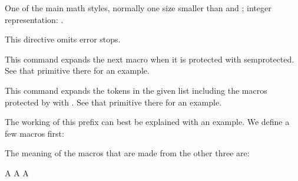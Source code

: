 \stopnewprimitive

\startoldprimitive[title={\prm {scriptstyle}}]

One of the main math styles, normally one size smaller than 
and ; integer representation: \the\scriptstyle.

\stopoldprimitive

\startoldprimitive[title={\prm {scrollmode}}]

    This directive omits error stops.

\stopoldprimitive

\startnewprimitive[title={\prm {semiexpand}}]

This command expands the next macro when it is protected with \prm
{semprotected}. See that primitive there for an example.

\stopnewprimitive

\startnewprimitive[title={\prm {semiexpanded}}]

This command expands the tokens in the given list including the macros protected
by with . See that primitive there for an example.

\stopnewprimitive

\startnewprimitive[title={\prm {semiprotected}}]

%
%

\startbuffer
              \def\TestA{A}
\semiprotected{}
    \protected{}

\edef\TestD{\TestA           \TestB           \TestC}
\edef\TestE{\TestA\semiexpand\TestB\semiexpand\TestC}
\edef\TestF{\TestA\expand    \TestB\expand    \TestC}

\edef\TestG{\expanded    {\TestA\TestB\TestC}}
\edef\TestH{\semiexpanded{\TestA\TestB\TestC}}
\stopbuffer

The working of this prefix can best be explained with an example. We define a few
macros first:

\typebuffer \getbuffer

The meaning of the macros that are made from the other three are:

\startbuffer
\meaningless\TestD
\meaningless\TestE
\meaningless\TestF
\meaningless\TestG
\meaningless\TestH
\stopbuffer

